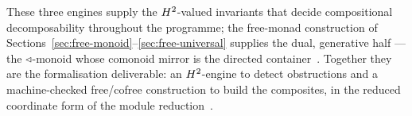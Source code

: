 \begin{remark}
These three engines supply the $H^2$-valued invariants that decide compositional decomposability throughout the programme; the free-monad construction of Sections~\ref{sec:free-monoid}--\ref{sec:free-universal} supplies the dual, generative half --- the $\triangleleft$-monoid whose comonoid mirror is the directed container~\cite{cl-emergent}. Together they are the formalisation deliverable: an $H^2$-engine to detect obstructions and a machine-checked free/cofree construction to build the composites, in the reduced coordinate form of the module reduction~\cite{macbeth-reduction}.
\end{remark}
